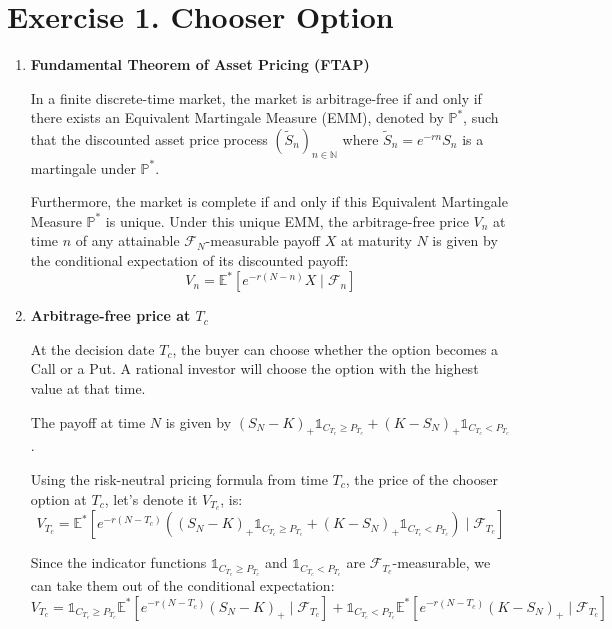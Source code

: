 \section{Exercise 1. Chooser Option}

\begin{enumerate}
      \item \textbf{Fundamental Theorem of Asset Pricing (FTAP)}

            In a finite discrete-time market, the market is arbitrage-free if and only if there exists an Equivalent Martingale Measure (EMM), denoted by $\mathbb{P}^*$, such that the discounted asset price process $(\tilde{S}_n)_{n \in \mathbb{N}}$ where $\tilde{S}_n = e^{-rn} S_n$ is a martingale under $\mathbb{P}^*$.

            Furthermore, the market is complete if and only if this Equivalent Martingale Measure $\mathbb{P}^*$ is unique. Under this unique EMM, the arbitrage-free price $V_n$ at time $n$ of any attainable $\mathcal{F}_N$-measurable payoff $X$ at maturity $N$ is given by the conditional expectation of its discounted payoff:
            \[ V_n = \mathbb{E}^*\left[ e^{-r(N-n)} X \mid \mathcal{F}_n \right] \]

      \item \textbf{Arbitrage-free price at $T_c$}

            At the decision date $T_c$, the buyer can choose whether the option becomes a Call or a Put. A rational investor will choose the option with the highest value at that time.

            The payoff at time $N$ is given by $(S_N - K)_+ \mathds{1}_{C_{T_c} \ge P_{T_c}} + (K - S_N)_+ \mathds{1}_{C_{T_c} < P_{T_c}}$.

            Using the risk-neutral pricing formula from time $T_c$, the price of the chooser option at $T_c$, let's denote it $V_{T_c}$, is:
            \[ V_{T_c} = \mathbb{E}^*\left[ e^{-r(N-T_c)} \left( (S_N - K)_+ \mathds{1}_{C_{T_c} \ge P_{T_c}} + (K - S_N)_+ \mathds{1}_{C_{T_c} < P_{T_c}} \right) \mid \mathcal{F}_{T_c} \right] \]

            Since the indicator functions $\mathds{1}_{C_{T_c} \ge P_{T_c}}$ and $\mathds{1}_{C_{T_c} < P_{T_c}}$ are $\mathcal{F}_{T_c}$-measurable, we can take them out of the conditional expectation:
            \[ V_{T_c} = \mathds{1}_{C_{T_c} \ge P_{T_c}} \mathbb{E}^*\left[ e^{-r(N-T_c)} (S_N - K)_+ \mid \mathcal{F}_{T_c} \right] + \mathds{1}_{C_{T_c} < P_{T_c}} \mathbb{E}^*\left[ e^{-r(N-T_c)} (K - S_N)_+ \mid \mathcal{F}_{T_c} \right] \]


\end{enumerate}
